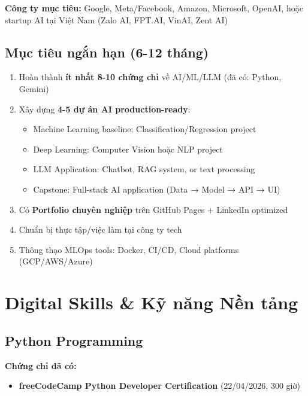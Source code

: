 \documentclass[12pt,a4paper]{article}
\begin{document}
\textbf{Công ty mục tiêu:} Google, Meta/Facebook, Amazon, Microsoft, OpenAI, hoặc startup AI tại Việt Nam (Zalo AI, FPT.AI, VinAI, Zent AI)

\subsection{Mục tiêu ngắn hạn (6-12 tháng)}

\begin{enumerate}
    \item Hoàn thành \textbf{ít nhất 8-10 chứng chỉ} về AI/ML/LLM (đã có: Python, Gemini)
    \item Xây dựng \textbf{4-5 dự án AI production-ready}:
        \begin{itemize}
            \item Machine Learning baseline: Classification/Regression project
            \item Deep Learning: Computer Vision hoặc NLP project
            \item LLM Application: Chatbot, RAG system, or text processing
            \item Capstone: Full-stack AI application (Data → Model → API → UI)
        \end{itemize}
    \item Có \textbf{Portfolio chuyên nghiệp} trên GitHub Pages + LinkedIn optimized
    \item Chuẩn bị thực tập/việc làm tại công ty tech
    \item Thông thạo MLOps tools: Docker, CI/CD, Cloud platforms (GCP/AWS/Azure)
\end{enumerate}

\newpage


\section{Digital Skills \& Kỹ năng Nền tảng}

\subsection{Python Programming}

\textbf{Chứng chỉ đã có:}
\begin{itemize}
    \item \textbf{freeCodeCamp Python Developer Certification} (22/04/2026, 300 giờ)
\end{itemize}
\end{document}
